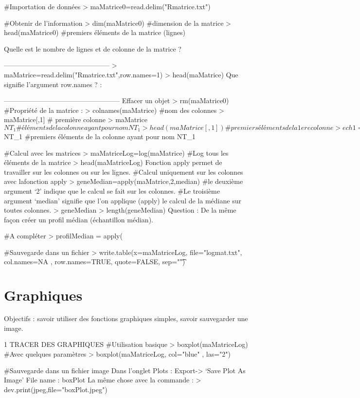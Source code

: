 \#Importation de données
> maMatrice0=read.delim("Rmatrice.txt")

\#Obtenir de l'information
> dim(maMatrice0) \#dimension de la matrice
> head(maMatrice0) \#premiers éléments de la matrice (lignes)

Quelle est le nombre de lignes et de colonne de la matrice ?

-----------------------------------------------
> maMatrice=read.delim("Rmatrice.txt",row.names=1)
> head(maMatrice)
Que signifie l'argument row.names ? :

---------------------------------------------------
Effacer un objet
> rm(maMatrice0)
\#Propriété de la matrice :
> colnames(maMatrice) \#nom des colonnes
> maMatrice[,1] \# première colonne
> maMatrice$NT_1 \# éléments de la colonne ayant pour nom NT_1
> head(maMatrice[,1]) \#premiers éléments de la 1ere colonne
> ech1= maMatrice[,1]
> echNT1=maMatrice$NT_1 \#premiers éléments de la colonne ayant pour nom NT_1

\#Calcul avec les matrices
> maMatriceLog=log(maMatrice) \#Log tous les éléments de la matrice
> head(maMatriceLog)
Fonction apply permet de travailler sur les colonnes ou sur les lignes.
\#Calcul uniquement sur les colonnes avec lafonction apply
> geneMedian=apply(maMatrice,2,median)
\#le deuxième argument ‘2' indique que le calcul se fait sur les colonnes. 
\#Le troisième argument ‘median' signifie que l'on applique (apply) le calcul de la médiane sur toutes colonnes.
> geneMedian
> length(geneMedian)
Question : De la même façon créer un profil médian (échantillon médian).

\#A compléter
> profilMedian = apply(

\#Sauvegarde dans un fichier
> write.table(x=maMatriceLog, file="logmat.txt", col.names=NA ,
row.names=TRUE, quote=FALSE, sep="\t")


\section{Graphiques}
Objectifs : savoir utiliser des fonctions graphiques simples, savoir sauvegarder une image.

1	TRACER DES GRAPHIQUES
\#Utilisation basique
> boxplot(maMatriceLog)
\#Avec quelques paramètres
> boxplot(maMatriceLog, col="blue" , las="2")

\#Sauvegarde dans un fichier image
Dans l'onglet Plots : Export-> ‘Save Plot As Image'
File name :  boxPlot
La même chose avec la commande : 
> dev.print(jpeg,file="boxPlot.jpeg")

